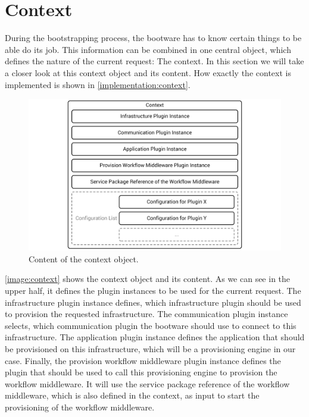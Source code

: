 \section{Context}
\label{design:context}

During the bootstrapping process, the bootware has to know certain things to be able do its job.
This information can be combined in one central object, which defines the nature of the current request: The context.
In this section we will take a closer look at this context object and its content.
How exactly the context is implemented is shown in \autoref{implementation:context}.

\begin{figure}[!htbp]
	\centering
	\includegraphics[resolution=600]{design/assets/context}
	\caption{Content of the context object.}
	\label{image:context}
\end{figure}

\autoref{image:context} shows the context object and its content.
As we can see in the upper half, it defines the plugin instances to be used for the current request.
The infrastructure plugin instance defines, which infrastructure plugin should be used to provision the requested infrastructure.
The communication plugin instance selects, which communication plugin the bootware should use to connect to this infrastructure.
The application plugin instance defines the application that should be provisioned on this infrastructure, which will be a provisioning engine in our case.
Finally, the provision workflow middleware plugin instance defines the plugin that should be used to call this provisioning engine to provision the workflow middleware.
It will use the service package reference of the workflow middleware, which is also defined in the context, as input to start the provisioning of the workflow middleware.

